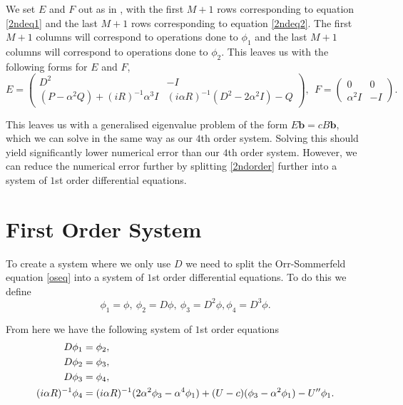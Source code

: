 We set $E$ and $F$ out as in \cite{bukhari1997spectral}, with the first $ M + 1 $ rows corresponding to equation \eqref{2ndeq1} and the last $ M + 1 $ rows corresponding to equation \eqref{2ndeq2}. The first $ M + 1$ columns will correspond to operations done to $ \phi_1$ and the last $ M + 1 $ columns will correspond to operations done to $\phi_2$. This leaves us with the following forms for $E$ and $F$,
\begin{equation}
    E = \begin{pmatrix}
        D^2 & -I \\
        (P - \alpha^2 Q) + (i R)^{-1} \alpha^3 I & (i \alpha R)^{-1} (D^2 - 2 \alpha^2 I) - Q
    \end{pmatrix},\ \
    F = \begin{pmatrix}
        0 & 0 \\
        \alpha^2 I & -I
    \end{pmatrix}.
\label{2ndblockform}
\end{equation}

This leaves us with a generalised eigenvalue problem of the form $ E \mathbf{b} = c B \mathbf{b} $, which we can solve in the same way as our $4$th order system. Solving this should yield significantly lower numerical error than our $4$th order system. However, we can reduce the numerical error further by splitting \eqref{2ndorder} further into a system of $1$st order differential equations.

\section{First Order System}

To create a system where we only use $ D$ we need to split the Orr-Sommerfeld equation \eqref{oseq} into a system of $1$st order differential equations. To do this we define
\begin{equation} \phi_1 = \phi,\ \phi_2 = D \phi,\ \phi_3 = D^2 \phi, \phi_4 = D^3 \phi.
\label{p4}
\end{equation}

From here we have the following system of $1$st order equations
\begin{subequations}
    \begin{align}
        D \phi_1 &= \phi_2, \\
        D \phi_2 &= \phi_3, \\
        D \phi_3 &= \phi_4, \\
        (i \alpha R)^{-1} \phi_4 &= (i \alpha R)^{-1} (2 \alpha^2 \phi_3 - \alpha^4 \phi_1) + (U - c)(\phi_3 - \alpha^2 \phi_1) - U'' \phi_1.
    \end{align}
    \label{1storder}
\end{subequations}

